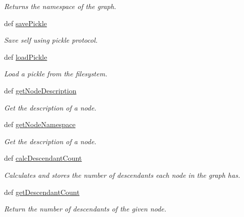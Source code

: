 \begin{DoxyCompactItemize}
\begin{DoxyCompactList}\small\item\em Returns the namespace of the graph. \end{DoxyCompactList}\item 
def \hyperlink{classgographer_1_1_g_o_graph_1_1_g_o_graph_a1f0fa0879611bf23be5977bdff1e29d7}{save\-Pickle}
\begin{DoxyCompactList}\small\item\em Save self using pickle protocol. \end{DoxyCompactList}\item 
def \hyperlink{classgographer_1_1_g_o_graph_1_1_g_o_graph_accda51360f6e55aeb466ab84c11877fc}{load\-Pickle}
\begin{DoxyCompactList}\small\item\em Load a pickle from the filesystem. \end{DoxyCompactList}\item 
def \hyperlink{classgographer_1_1_g_o_graph_1_1_g_o_graph_a3770da07e30351e6cee836badfd81a6d}{get\-Node\-Description}
\begin{DoxyCompactList}\small\item\em Get the description of a node. \end{DoxyCompactList}\item 
def \hyperlink{classgographer_1_1_g_o_graph_1_1_g_o_graph_adcde4047692fb0006926fd45692404ba}{get\-Node\-Namespace}
\begin{DoxyCompactList}\small\item\em Get the description of a node. \end{DoxyCompactList}\item 
\hypertarget{classgographer_1_1_g_o_graph_1_1_g_o_graph_a7c7b036c555bf226c7d0877cd15e2dee}{def \hyperlink{classgographer_1_1_g_o_graph_1_1_g_o_graph_a7c7b036c555bf226c7d0877cd15e2dee}{calc\-Descendant\-Count}}\label{classgographer_1_1_g_o_graph_1_1_g_o_graph_a7c7b036c555bf226c7d0877cd15e2dee}

\begin{DoxyCompactList}\small\item\em Calculates and stores the number of descendants each node in the graph has. \end{DoxyCompactList}\item 
def \hyperlink{classgographer_1_1_g_o_graph_1_1_g_o_graph_a12134f0c734684a4947b833e933c927e}{get\-Descendant\-Count}
\begin{DoxyCompactList}\small\item\em Return the number of descendants of the given node. \end{DoxyCompactList}\end{DoxyCompactItemize}
